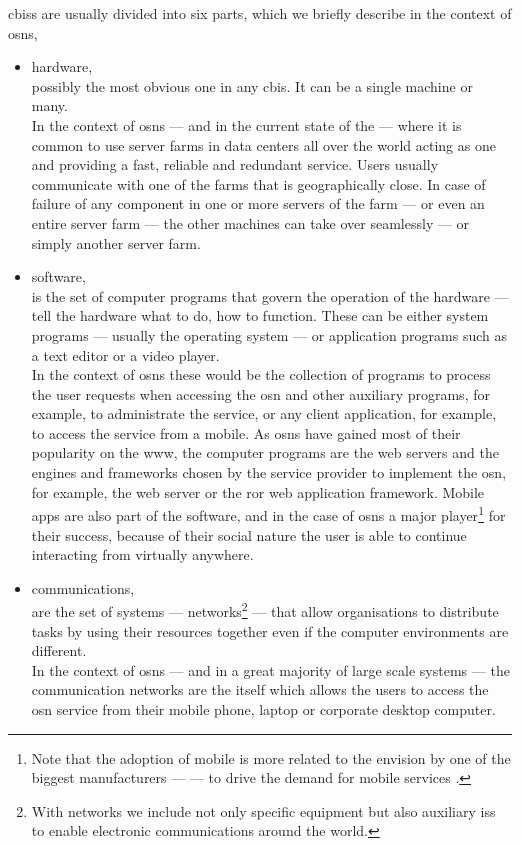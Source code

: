 \Acp{cbis} are usually divided into six parts, which we briefly describe in the 
context of \acp{osn},
\begin{itemize}
    \item hardware,\\
    possibly the most obvious one in any \ac{cbis}. It can be a single machine or 
    many.\\
    In the context of \acp{osn} --- and in the current state of the \Internet 
    --- where it is common to use server farms in data centers all over the world 
    acting as one and providing a fast, reliable and redundant service. Users usually 
    communicate with one of the farms that is geographically close. In case of failure 
    of any component in one or more servers of the farm --- or even an entire server 
    farm --- the other machines can take over seamlessly --- or simply another server 
    farm.
    
    \item software,\\
    is the set of computer programs that govern the operation of the hardware --- 
    tell the hardware what to do, how to function. These can be either system programs 
    --- usually the operating system --- or application programs such as a text 
    editor or a video player.\\
    In the context of \acp{osn} these would be the collection 
    of programs to process the user requests when accessing the \ac{osn} and other 
    auxiliary programs, for example, to administrate the service, or any client 
    application, for example, to access the service from a mobile. As \acp{osn} 
    have gained most of their popularity on the \ac{www}, the computer programs 
    are the web servers and the engines and frameworks chosen by the service provider 
    to implement the \ac{osn}, for example, the \Apache web server or the \ac{ror} 
    web application framework. Mobile apps are also part of the software, and in 
    the case of \acp{osn} a major player\footnote{Note that the adoption of mobile 
    \Internet is more related to the envision by one of the biggest manufacturers 
    --- \Apple --- to drive the demand for mobile services \cite{WestM10}.} for their 
    success, because of their social nature the user is able to continue interacting 
    from virtually anywhere.
    
    \item communications,\\
    are the set of systems --- networks\footnote{With networks we include not only 
    specific equipment but also auxiliary \acp{is} to enable electronic communications 
    around the world.} --- that allow organisations to distribute tasks by using 
    their resources together even if the computer environments are different.\\
    In the context of \acp{osn} --- and in a great majority of large scale systems --- 
    the communication networks are the \Internet itself which allows the users to 
    access the \ac{osn} service from their mobile phone, laptop or corporate desktop 
    computer.
    

\end{itemize}
